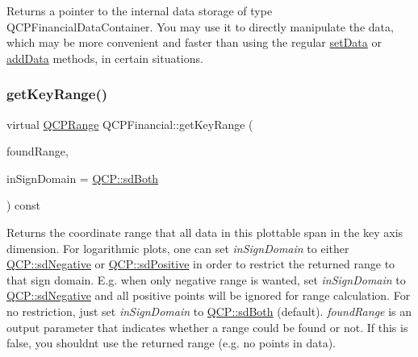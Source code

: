 Returns a pointer to the internal data storage of type Q\+C\+P\+Financial\+Data\+Container. You may use it to directly manipulate the data, which may be more convenient and faster than using the regular \hyperlink{class_q_c_p_financial_a72089e75b8a50d18097526c3c79fdb85}{set\+Data} or \hyperlink{class_q_c_p_financial_a372ac031e44a7a6c912d203556af96f7}{add\+Data} methods, in certain situations. \mbox{\label{class_q_c_p_financial_abb56add5757f53239d8bef462bd53578}} 
\subsubsection{\texorpdfstring{get\+Key\+Range()}{getKeyRange()}\hspace{0.1cm}{\footnotesize\ttfamily [1/2]}}
{\footnotesize\ttfamily virtual \hyperlink{class_q_c_p_range}{Q\+C\+P\+Range} Q\+C\+P\+Financial\+::get\+Key\+Range (\begin{DoxyParamCaption}\item[{bool \&}]{found\+Range,  }\item[{\hyperlink{namespace_q_c_p_afd50e7cf431af385614987d8553ff8a9}{Q\+C\+P\+::\+Sign\+Domain}}]{in\+Sign\+Domain = {\ttfamily \hyperlink{namespace_q_c_p_afd50e7cf431af385614987d8553ff8a9a3dee7e9cd2fedce9253b83e172626a6c}{Q\+C\+P\+::sd\+Both}} }\end{DoxyParamCaption}) const\hspace{0.3cm}{\ttfamily [virtual]}}

Returns the coordinate range that all data in this plottable span in the key axis dimension. For logarithmic plots, one can set {\itshape in\+Sign\+Domain} to either \hyperlink{namespace_q_c_p_afd50e7cf431af385614987d8553ff8a9a0b464fa3135be2808909739a969193c9}{Q\+C\+P\+::sd\+Negative} or \hyperlink{namespace_q_c_p_afd50e7cf431af385614987d8553ff8a9a23362334a52289677a51526a9b68db6c}{Q\+C\+P\+::sd\+Positive} in order to restrict the returned range to that sign domain. E.\+g. when only negative range is wanted, set {\itshape in\+Sign\+Domain} to \hyperlink{namespace_q_c_p_afd50e7cf431af385614987d8553ff8a9a0b464fa3135be2808909739a969193c9}{Q\+C\+P\+::sd\+Negative} and all positive points will be ignored for range calculation. For no restriction, just set {\itshape in\+Sign\+Domain} to \hyperlink{namespace_q_c_p_afd50e7cf431af385614987d8553ff8a9a3dee7e9cd2fedce9253b83e172626a6c}{Q\+C\+P\+::sd\+Both} (default). {\itshape found\+Range} is an output parameter that indicates whether a range could be found or not. If this is false, you shouldn\textquotesingle{}t use the returned range (e.\+g. no points in data).

